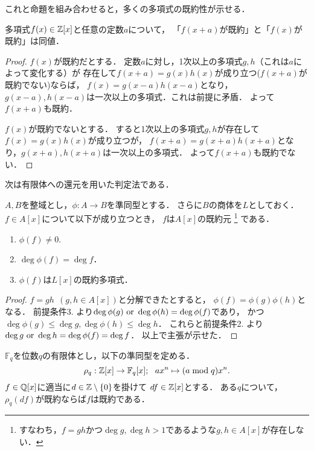 \documentclass[a4j]{jsarticle}
\begin{document}
これと命題を組み合わせると，多くの多項式の既約性が示せる．
\begin{Prop}
    多項式$f(x) \in \mathbb{Z}[x]$と任意の定数$a$について，
    「$f(x+a)$が既約」と「$f(x)$が既約」は同値．
\end{Prop}
\begin{proof}
    $f(x)$が既約だとする．
    定数$a$に対し，1次以上の多項式$g,h$（これは$a$によって変化する）が
    存在して$f(x+a)=g(x)h(x)$が成り立つ($f(x+a)$が既約でない)ならば，
    $f(x)=g(x-a)h(x-a)$となり，$g(x-a), h(x-a)$は一次以上の多項式．これは前提に矛盾．
    よって$f(x+a)$も既約．

    $f(x)$が既約でないとする．
    すると1次以上の多項式$g,h$が存在して$f(x)=g(x)h(x)$が成り立つが，
    $f(x+a)=g(x+a) h(x+a)$となり，$g(x+a), h(x+a)$は一次以上の多項式．
    よって$f(x+a)$も既約でない．
\end{proof}

次は有限体への還元を用いた判定法である．
\begin{Thm}
    $A,B$を整域とし，$\phi: A \to B$を準同型とする．
    さらに$B$の商体を$L$としておく．
    $f \in A[x]$について以下が成り立つとき，
    $f$は$A[x]$の既約元
    \footnote{すなわち，$f=gh$かつ$\deg g, \deg h >1$であるような$g,h \in A[x]$が存在しない．}
    である．
    \begin{enumerate}
        \item $\phi(f) \neq 0$.
        \item $\deg \phi(f)=\deg f$．
        \item $\phi(f)$は$L[x]$の既約多項式．
    \end{enumerate}
\end{Thm}
\begin{proof}
    $f=gh ~~(g,h \in A[x])$と分解できたとすると，
    $\phi(f)=\phi(g) \phi(h)$となる．
    前提条件3. より$\deg \phi(g) \text{ or } \deg \phi(h)=\deg \phi(f)$であり，
    かつ$\deg \phi(g) \leq \deg g, \deg \phi(h) \leq \deg h$．
    これらと前提条件2. より$\deg g \text{ or } \deg h=\deg \phi(f)=\deg f$．
    以上で主張が示せた．
\end{proof}

\begin{Cor}
    $\mathbb{F}_q$を位数$q$の有限体とし，以下の準同型を定める．
    \[ \rho_q: \mathbb{Z}[x] \to \mathbb{F}_q[x];~~ ax^n \mapsto (a \bmod q)x^n. \]
    $f \in \mathbb{Q}[x]$に適当に$d \in \mathbb{Z} \setminus \{0\}$を掛けて
    $df \in \mathbb{Z}[x]$とする．
    ある$q$について，$\rho_q(df)$が既約ならば$f$は既約である．
\end{Cor}
\end{document}
